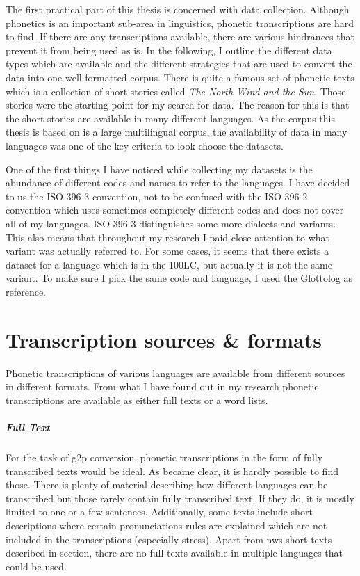 \label{chap:data_collection}
The first practical part of this thesis is concerned with data collection. Although phonetics is an important sub-area in linguistics, phonetic transcriptions are hard to find. If there are any transcriptions available, there are various hindrances that prevent it from being used as is. In the following, I outline the different data types which are available and the different strategies that are used to convert the data into one well-formatted corpus. There is quite a famous set of phonetic texts which is a collection of short stories called \textit{The North Wind and the Sun}. Those stories were the starting point for my search for data. The reason for this is that the short stories are available in many different languages. As the corpus  this thesis is based on is a large multilingual corpus, the availability of data in many languages was one of the key criteria to look choose the datasets.

One of the first things I have noticed while collecting my datasets is the abundance of different codes and names to refer to the languages. I have decided to us the ISO 396-3 convention, not to be confused with the ISO 396-2 convention which uses sometimes completely different codes and does not cover all of my languages. ISO 396-3 distinguishes some more dialects and variants. This also means that throughout my research I paid close attention to what variant was actually referred to. For some cases, it seems that there exists a dataset for a language which is in the 100LC, but actually it is not the same variant. To make sure I pick the same code and language, I used the Glottolog as reference.


\section{Transcription sources \& formats}
Phonetic transcriptions of various languages are available from different sources in different formats. From what I have found out in my research phonetic transcriptions are available as either full texts or a word lists.

\subparagraph{Full Text}
For the task of \ac{g2p} conversion, phonetic transcriptions in the form of fully transcribed texts would be ideal. As became clear, it is hardly possible to find those. There is plenty of material describing how different languages can be transcribed but those rarely contain fully transcribed text. If they do, it is mostly limited to one or a few sentences. Additionally, some texts include short descriptions where certain pronunciations rules are explained which are not included in the transcriptions (especially stress). Apart from \ac{nws} short texts described in section, there are no full texts available in multiple languages that could be used.

